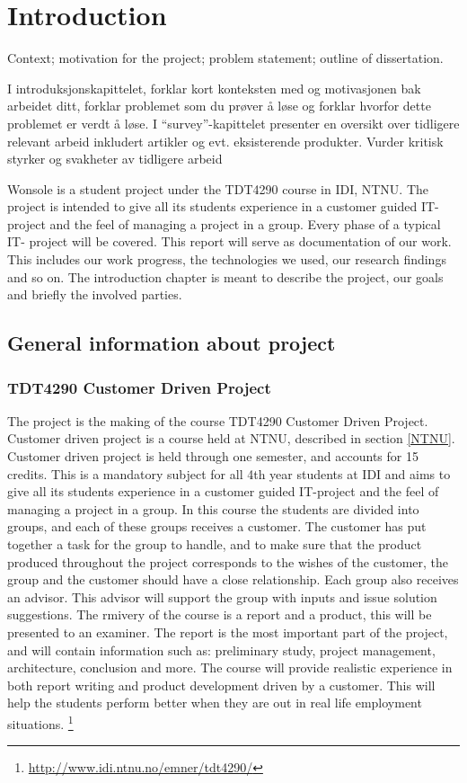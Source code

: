 \chapter{Introduction}

\minitoc


Context;  motivation  for the project;  problem statement;  outline of
dissertation.

I introduksjonskapittelet, forklar kort
konteksten med og motivasjonen bak arbeidet
ditt, forklar problemet som du prøver å løse og
forklar hvorfor dette problemet er verdt å løse.
I “survey”-kapittelet presenter en oversikt over
tidligere relevant arbeid inkludert artikler og
evt. eksisterende produkter. Vurder kritisk
styrker og svakheter av tidligere arbeid


Wonsole is a student project under the TDT4290 course in IDI, NTNU. The project is intended to give all its students experience in a customer guided IT- project and the feel of managing a project in a group. Every phase of a typical IT- project will be covered. This report will serve as documentation of our work. This includes our work progress, the technologies we used, our research findings and so on. The introduction chapter is meant to describe the project, our goals and briefly the involved parties.

\clearpage

\section{General information about project}

\subsection{TDT4290 Customer Driven Project}
The project is the making of the course TDT4290 Customer Driven Project. Customer driven project is a course held at NTNU, described in section \ref{NTNU}. Customer driven project is held through one semester, and accounts for 15 credits. This is a mandatory subject for all 4th year students at IDI and aims to give all its students experience in a customer guided IT-project and the feel of managing a project in a group. In this course the students are divided into groups, and each of these groups receives a customer.
The customer has put together a task for the group to handle, and to make sure that the product produced throughout the project corresponds to the wishes of the customer, the group and the customer should have a close relationship.
Each group also receives an advisor. This advisor will support the group with inputs and issue solution suggestions.
The rmivery of the course is a report and a product, this will be presented to an examiner. The report is the most important part of the project, and will contain information such as: preliminary study, project management, architecture, conclusion and more.
The course will provide realistic experience in both report writing and product development driven by a customer. This will help the students perform better when they are out in real life employment situations.
\footnote{\url{http://www.idi.ntnu.no/emner/tdt4290/}}

